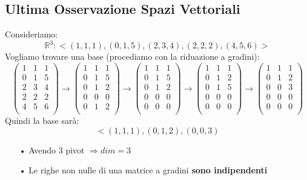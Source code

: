 \subsection{Ultima Osservazione Spazi Vettoriali}
Consideriamo: 
$$ \mathbb{R}^3: < (1,1,1),(0,1,5),(2,3,4),(2,2,2),(4,5,6) >$$
Vogliamo trovare una base (procediamo con la riduazione a gradini):
$$ 
\begin{pmatrix}
1 & 1 & 1 \\
0 & 1 & 5 \\
2 & 3 & 4 \\
2 & 2 & 2 \\
4 & 5 & 6 \\
\end{pmatrix}
\rightarrow
\begin{pmatrix}
1 & 1 & 1 \\
0 & 1 & 5 \\
0 & 1 & 2 \\
0 & 0 & 0 \\
0 & 1 & 2 \\
\end{pmatrix}
\rightarrow
\begin{pmatrix}
1 & 1 & 1 \\
0 & 1 & 5 \\
0 & 1 & 2 \\
0 & 0 & 0 \\
0 & 0 & 0 \\
\end{pmatrix}
\rightarrow
\begin{pmatrix}
1 & 1 & 1 \\
0 & 1 & 2 \\
0 & 1 & 5 \\
0 & 0 & 0 \\
0 & 0 & 0 \\
\end{pmatrix}
\rightarrow
\begin{pmatrix}
1 & 1 & 1 \\
0 & 1 & 2 \\
0 & 0 & 3 \\
0 & 0 & 0 \\
0 & 0 & 0 \\
\end{pmatrix}
$$
Quindi la base sarà:
$$ <(1,1,1),(0,1,2),(0,0,3) $$
\begin{itemize}
\item[•] Avendo $3$ pivot $\Rightarrow dim = 3$
\item[•] Le righe non nulle di una matrice a gradini \textbf{sono indipendenti}
\end{itemize}

